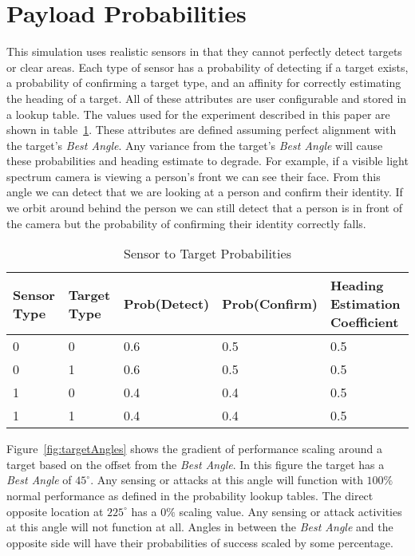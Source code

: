 \section{Payload Probabilities}
\label{sec:payload_probs}
This simulation uses realistic sensors in that they cannot perfectly detect targets or clear areas.  Each type of sensor has a probability of detecting if a target exists, a probability of confirming a target type, and an affinity for correctly estimating the heading of a target.  All of these attributes are user configurable and stored in a lookup table.  The values used for the experiment described in this paper are shown in table~\ref{tab:snsrTgtProb}.  These attributes are defined assuming perfect alignment with the target's \textit{Best Angle}.  Any variance from the target's \textit{Best Angle} will cause these probabilities and heading estimate to degrade.  For example, if a visible light spectrum camera is viewing a person's front we can see their face.  From this angle we can detect that we are looking at a person and confirm their identity.  If we orbit around behind the person we can still detect that a person is in front of the camera but the probability of confirming their identity correctly falls.

\begin{table}[H]
	\caption{Sensor to Target Probabilities}
	\centering
	\label{tab:snsrTgtProb}
	\begin{tabular}{|p{1cm}|p{1cm}|p{1cm}|p{1cm}|p{1cm}|}
		\hline
		Sensor Type & Target Type & Prob(Detect) & Prob(Confirm) & Heading Estimation Coefficient\\ \hline
		0 & 0 & 0.6 & 0.5 & 0.5 \\
		0 & 1 & 0.6 & 0.5 & 0.5 \\
		1 & 0 & 0.4 & 0.4 & 0.5 \\
		1 & 1 & 0.4 & 0.4 & 0.5 \\
		\hline
	\end{tabular}
\end{table}

Figure~\ref{fig:targetAngles} shows the gradient of performance scaling around a target based on the offset from the \textit{Best Angle}.  In this figure the target has a \textit{Best Angle} of $45^{\circ}$.  Any sensing or attacks at this angle will function with $100\%$ normal performance as defined in the probability lookup tables.  The direct opposite location at $225^{\circ}$ has a $0\%$ scaling value.  Any sensing or attack activities at this angle will not function at all.  Angles in between the \textit{Best Angle} and the opposite side will have their probabilities of success scaled by some percentage.

